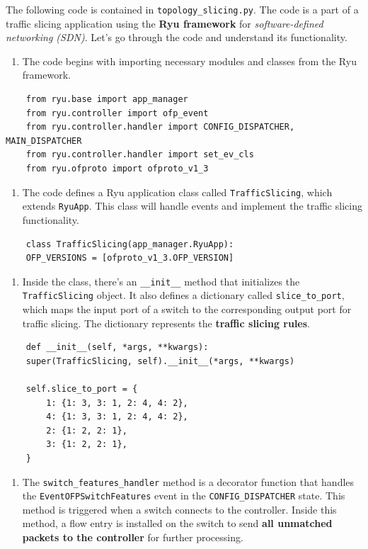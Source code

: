 \documentclass[10pt,a4paper]{report}
\theoremstyle{definition}
\begin{document}
The following code is contained in \texttt{topology\_slicing.py}.
The code is a part of a traffic slicing application using the \textbf{Ryu framework} for \textit{software-defined networking (SDN)}. Let's go through the code and understand its functionality.
\begin{enumerate}
	\item 
	The code begins with importing necessary modules and classes from the Ryu framework.
\end{enumerate}
\begin{lstlisting}
	from ryu.base import app_manager
	from ryu.controller import ofp_event
	from ryu.controller.handler import CONFIG_DISPATCHER, MAIN_DISPATCHER
	from ryu.controller.handler import set_ev_cls
	from ryu.ofproto import ofproto_v1_3
\end{lstlisting}
\begin{enumerate}
	\item 
The code defines a Ryu application class called \texttt{TrafficSlicing}, which extends \texttt{RyuApp}. This class will handle events and implement the traffic slicing functionality.
\end{enumerate}
\begin{lstlisting}
	class TrafficSlicing(app_manager.RyuApp):
	OFP_VERSIONS = [ofproto_v1_3.OFP_VERSION]
\end{lstlisting}
\begin{enumerate}
	\item 
	Inside the class, there's an \texttt{\_\_init\_\_} method that initializes the \texttt{TrafficSlicing} object. It also defines a dictionary called \texttt{slice\_to\_port}, which maps the input port of a switch to the corresponding output port for traffic slicing. The dictionary represents the \textbf{traffic slicing rules}.
\end{enumerate}
\begin{lstlisting}
	def __init__(self, *args, **kwargs):
	super(TrafficSlicing, self).__init__(*args, **kwargs)
	
	self.slice_to_port = {
		1: {1: 3, 3: 1, 2: 4, 4: 2},
		4: {1: 3, 3: 1, 2: 4, 4: 2},
		2: {1: 2, 2: 1},
		3: {1: 2, 2: 1},
	}
\end{lstlisting}
\begin{enumerate}
	\item 
	The \texttt{switch\_features\_handler} method is a decorator function that handles the \texttt{EventOFPSwitchFeatures} event in the \texttt{CONFIG\_DISPATCHER} state. This method is triggered when a switch connects to the controller. Inside this method, a flow entry is installed on the switch to send \textbf{all unmatched packets to the controller} for further processing.
\end{enumerate}
\end{document}
